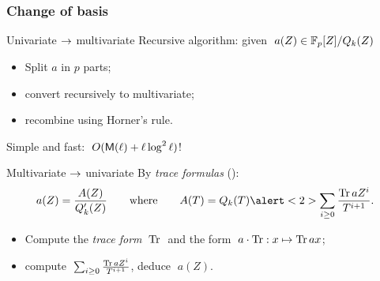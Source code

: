 \documentclass[10pt,usepdftitle=false]{beamer}
\begin{document}

  


\begin{frame}
  \frametitle{Change of basis}

  \begin{block}{Univariate $\rightarrow$ multivariate}
    Recursive algorithm: given $\;a(Z)\in\mathbb{F}_p[Z]/Q_k(Z)$
    \begin{itemize}
    \item Split $a$ in $p$ parts;
    \item convert recursively to multivariate;
    \item recombine using Horner's rule.
    \end{itemize}
    Simple and fast: \emph{$\;O(\mathsf{M}(\ell) + \ell\log^2\ell)$}!
  \end{block}

  \begin{block}{Multivariate $\rightarrow$ univariate}
    By \textit{trace formulas} (\cite{rouiller99}):
      \[
      a(Z) = \frac{A(Z)}{Q_k'(Z)}
      \qquad\text{where}\qquad
      A(T) = Q_k(T)\alert<2>{\sum_{i\ge 0}\frac{\Tr aZ^i}{T^{i+1}}}
      \text{.}\]
    \begin{itemize}
    \item Compute the \textit{trace form} $\;\operatorname{Tr}\;$ and the form
      $\;a\cdot\operatorname{Tr} : x\mapsto \operatorname{Tr} ax$;
    \item \alert<2>{compute $\;\sum_{i\ge 0}\frac{\operatorname{Tr} aZ^i}{T^{i+1}}$}, deduce $\;a(Z)$.
    \end{itemize}
  \end{block}
\end{frame}

\end{document}
